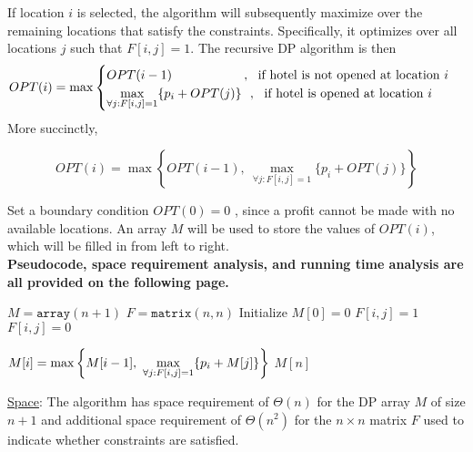 \documentclass[twoside,11pt]{homework}
\newcommand\NoProc{\renewcommand\algorithmicprocedure{}}
\begin{document}
\noindent
If location $i$ is selected,  the algorithm will subsequently maximize over the remaining locations that satisfy the constraints.  Specifically, it optimizes over all locations $j$ such that $F[i,j] = 1$.  The recursive DP algorithm is then 
$$OPT(i) = \max 
\begin{cases} 
OPT(i-1) \ \ \ \ \ \ \ \ \ \ \ \ \ \ \ \ \ , \ \ \textrm{if hotel is not opened at location } i \\
\mathlarger{ \max_{\forall j : F[i,j]=1} \{ p_i + OPT(j)\}} \ \ , \ \ \textrm{if hotel is opened at location } i
\end{cases}
$$
More succinctly, 

$$OPT(i) = \max \left\lbrace OPT(i-1), \ \max_{\forall j : F[i,j]=1} \{p_i + OPT(j)\} \right\rbrace$$

\noindent
Set a boundary condition $OPT(0) = 0$ ,  since a profit cannot be made with no available locations.  An array $M$ will be used to store the values of $OPT(i)$,  which will be filled in from left to right.  \\

\noindent
\textbf{Pseudocode, space requirement analysis, and running time analysis are all provided on the following page.}
\begin{algorithm}[H]
\begin{algorithmic}[1]
\NoProc
{}
\State $M = \texttt{array}(n+1)$    
\State $F = \texttt{matrix}(n, n)$    
\State Initialize $M[0] = 0$    
\State $F[i,j] = 1$
\Else
\State $F[i,j] = 0$
\EndIf
\EndFor
\EndFor

\State $\mathlarger{M[i] = \max \left\lbrace M[i-1], \ \max_{\forall j : F[i,j]=1} \{p_i + M[j]\} \right\rbrace }$
\EndFor
\State \Return $M[n]$
\EndProcedure
\end{algorithmic}
\end{algorithm}

\noindent
\underline{Space}: The algorithm has space requirement of $\Theta(n)$ for the DP array $M$ of size $n+1$ and additional space requirement of $\Theta(n^2)$ for the $n \times n$ matrix $F$ used to indicate whether constraints are satisfied.   \\
\end{document}

